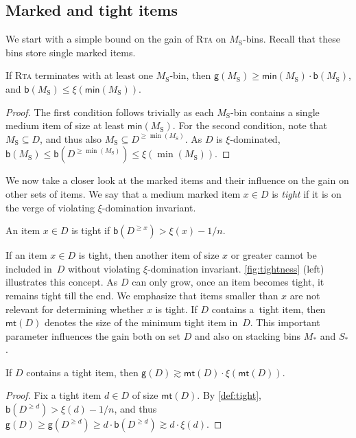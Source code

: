 \documentclass[a4paper,USenglish,cleveref]{lipics-v2019}
\newcommand{\M}{\ensuremath{M_\mathrm{S}}\xspace}
\newcommand{\ST}{\ensuremath{S_*}\xspace}
\newcommand{\MT}{\ensuremath{M_*}\xspace}
\newcommand{\D}{\ensuremath{D}\xspace}
\newcommand{\g}{\ensuremath{\xi}}
\newcommand{\B}{\textsf{b}}
\newcommand{\gain}{\textsf{g}}
\newcommand{\mn}{\textsf{min}}
\newcommand{\mt}{\textsf{mt}(\D)}
\newcommand{\ALG}{\textsc{Rta}\xspace}
\begin{document}

\subsection{Marked and tight items}

We start with a simple bound on the gain of \ALG on \M-bins. Recall that these
bins store single marked items.

\begin{lemma}
\label{lem:M-gain}
If \ALG terminates with at least one \M-bin, then $\gain(\M) \geq \mn(\M) \cdot \B(\M)$, 
and $\B(\M) \leq \g(\mn(\M))$. 
\end{lemma}

\begin{proof}
The first condition follows trivially as each \M-bin contains a single medium
item of size at least $\mn(\M)$. For the second condition, note that $\M \subseteq \D$, 
and thus also $\M \subseteq \D^{\geq \min(\M)}$. As \D is
\g-dominated, $\B(\M) \leq \B(D^{\geq \min(\M)}) \leq \g(\min(\M))$.
\end{proof}

We now take a closer look at the marked items and their influence on the gain on
other sets of items. We say that a medium marked item $x \in \D$ is
\emph{tight} if it is on the verge of violating $\g$-domination invariant.

\begin{definition}
\label{def:tight}
An item $x \in \D$ is tight if $\B(\D^{\geq x}) > \g(x) - 1/n$.
\end{definition}

If an item $x \in \D$ is tight, then another item of size $x$ or greater cannot
be included in~$\D$ without violating $\g$-domination invariant.
\cref{fig:tightness} (left) illustrates this concept. As $\D$ can only grow,
once an item becomes tight, it remains tight till the end. We emphasize that
items smaller than $x$ are not relevant for determining whether $x$ is tight. If
$\D$ contains a~tight item, then $\mt$ denotes the size of the minimum tight
item in~$\D$. This important parameter influences the gain both on set $D$ and
also on stacking bins $\MT$ and $\ST$.

\begin{lemma}
\label{lem:D-gain}
If $\D$ contains a tight item, then $\gain(\D) \gtrsim \mt \cdot \g(\mt)$.
\end{lemma}

\begin{proof}
Fix a tight item $d \in \D$ of size $\mt$. By \cref{def:tight},
$\B(\D^{\geq d}) > \g(d) - 1/n$, and thus $\gain(\D) \geq \gain(\D^{\geq d}) \geq d
\cdot \B(\D^{\geq d}) \gtrsim d \cdot \g(d)$.
\end{proof}
\end{document}
